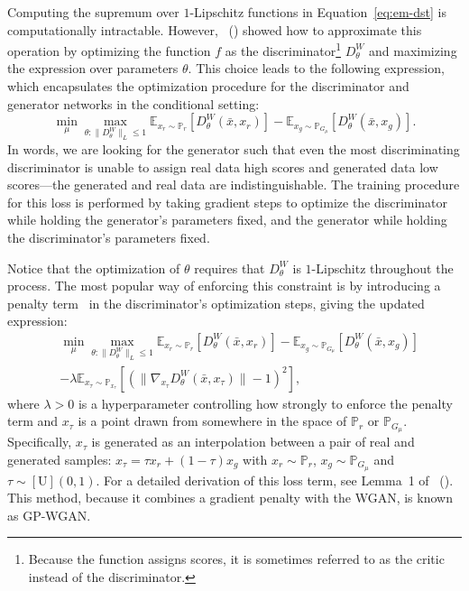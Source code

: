 \documentclass[letterpaper]{article} %
\newcommand{\namecite}[1]{\citeauthor{#1}~(\citeyear{#1})}
\begin{document}
Computing the supremum over $1$-Lipschitz functions in Equation~\eqref{eq:em-dst} is computationally intractable. However, \namecite{arjovsky2017wasserstein} showed how to approximate this operation by optimizing the function $f$ as the discriminator\footnote{Because the function assigns scores, it is sometimes referred to as the critic instead of the discriminator.} $D^W_\theta$ and maximizing the expression over parameters $\theta$. This choice leads to the following expression, which encapsulates the optimization procedure for the discriminator and generator networks in the conditional setting:
\begin{equation}
\min_{\mu} \max_{\theta : \|D^W_\theta\|_L \leq 1} \mathbb{E}_{x_r \sim \mathbb{P}_r} \left[ D^W_{\theta}(\bar{x}, x_r)\right] - \mathbb{E}_{x_g \sim \mathbb{P}_{G_\mu}} \left[ D^W_{\theta}(\bar{x}, x_g) \right].
\end{equation}
In words, we are looking for the generator such that even the most discriminating discriminator is unable to assign real data high scores and generated data low scores---the generated and real data are indistinguishable. The training procedure for this loss is performed by taking gradient steps to optimize the discriminator while holding the generator's parameters fixed, and the generator while holding the discriminator's parameters fixed. 

Notice that the optimization of $\theta$ requires that $D^W_\theta$ is $1$-Lipschitz throughout the process. The most popular way of enforcing this constraint is by introducing a penalty term~\cite{gulrajani17} in the discriminator's optimization steps, giving the updated expression:
\begin{equation}
\begin{aligned}
&\min_{\mu} \max_{\theta : \|D^W_\theta\|_L \leq 1} \mathbb{E}_{x_r \sim \mathbb{P}_r} \left[ D^W_{\theta}(\bar{x}, x_r)\right] - \mathbb{E}_{x_g \sim \mathbb{P}_{G_\mu}} \left[ D^W_{\theta}(\bar{x}, x_g) \right] \\
&- \lambda \mathbb{E}_{x_\tau \sim \mathbb{P}_{x_\tau}} \left[ (\|\nabla_{x_\tau} D^W_\theta(\bar{x}, x_\tau) \| - 1)^2 \right],
\end{aligned}
\end{equation}
where $\lambda > 0$ is a hyperparameter controlling how strongly to enforce the penalty term and $x_\tau$ is a point drawn from somewhere in the space of $\mathbb{P}_r$ or $\mathbb{P}_{G_\mu}$. Specifically, $x_\tau$ is generated as an interpolation between a pair of real and generated samples: $x_\tau = \tau x_r + (1 - \tau) x_g$ with $x_r \sim \mathbb{P}_r$, $x_g \sim \mathbb{P}_{G_\mu}$ and $\tau \sim [\text{U}](0,1)$. For a detailed derivation of this loss term, see Lemma~1 of \namecite{gulrajani17}. This method, because it combines a gradient penalty with the WGAN, is known as GP-WGAN.
\end{document}

